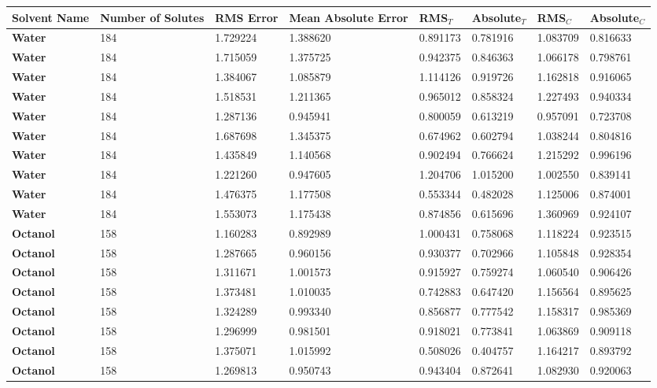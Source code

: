 \documentclass{amsart}
\begin{document}
 
\begin{center}
\begin{tabular}{|l|l|l|l|l|l|l|l|} 
\hline  
\textbf{Solvent Name}&\textbf{Number of Solutes}&\textbf{RMS Error}&\textbf{Mean Absolute Error}&\textbf{RMS$_{T}$}&\textbf{Absolute$_{T}$}&\textbf{RMS$_{C}$}&\textbf{Absolute$_{C}$} \\ \hline
\hline 
\textbf{Water}&184&1.729224&1.388620&0.891173&0.781916&1.083709&0.816633 \\ \hline 
\textbf{Water}&184&1.715059&1.375725&0.942375&0.846363&1.066178&0.798761 \\ \hline 
\textbf{Water}&184&1.384067&1.085879&1.114126&0.919726&1.162818&0.916065 \\ \hline 
\textbf{Water}&184&1.518531&1.211365&0.965012&0.858324&1.227493&0.940334 \\ \hline 
\textbf{Water}&184&1.287136&0.945941&0.800059&0.613219&0.957091&0.723708 \\ \hline 
\textbf{Water}&184&1.687698&1.345375&0.674962&0.602794&1.038244&0.804816 \\ \hline 
\textbf{Water}&184&1.435849&1.140568&0.902494&0.766624&1.215292&0.996196 \\ \hline 
\textbf{Water}&184&1.221260&0.947605&1.204706&1.015200&1.002550&0.839141 \\ \hline 
\textbf{Water}&184&1.476375&1.177508&0.553344&0.482028&1.125006&0.874001 \\ \hline 
\textbf{Water}&184&1.553073&1.175438&0.874856&0.615696&1.360969&0.924107 \\ \hline 
\textbf{Octanol}&158&1.160283&0.892989&1.000431&0.758068&1.118224&0.923515 \\ \hline 
\textbf{Octanol}&158&1.287665&0.960156&0.930377&0.702966&1.105848&0.928354 \\ \hline 
\textbf{Octanol}&158&1.311671&1.001573&0.915927&0.759274&1.060540&0.906426 \\ \hline 
\textbf{Octanol}&158&1.373481&1.010035&0.742883&0.647420&1.156564&0.895625 \\ \hline 
\textbf{Octanol}&158&1.324289&0.993340&0.856877&0.777542&1.158317&0.985369 \\ \hline 
\textbf{Octanol}&158&1.296999&0.981501&0.918021&0.773841&1.063869&0.909118 \\ \hline 
\textbf{Octanol}&158&1.375071&1.015992&0.508026&0.404757&1.164217&0.893792 \\ \hline 
\textbf{Octanol}&158&1.269813&0.950743&0.943404&0.872641&1.082930&0.920063 \\ \hline 

\end{tabular}
\end{center}
\end{document}
